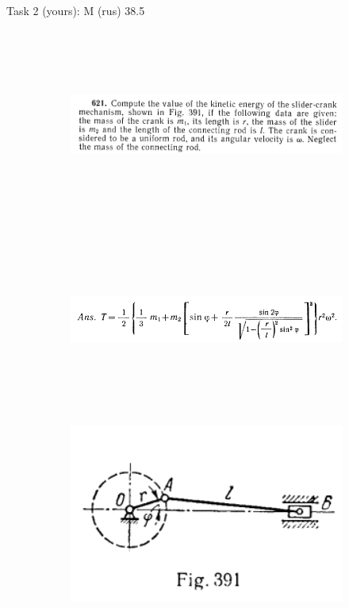 \documentclass[aspectratio=169]{beamer}
\begin{document}
    \begin{frame}[t]{Task 2 (yours): M (rus) 38.5}
    \framesubtitle{}
        \begin{figure}[H]
            \begin{subfigure}{0.9\textwidth}
                \centering\includegraphics[height=6cm,width=1\textwidth,keepaspectratio]{image11.png}
                \label{fig:image11}
            \end{subfigure}
            \begin{subfigure}{0.69\textwidth}
                \centering\includegraphics[height=6cm,width=1\textwidth,keepaspectratio]{image13.png}
                \label{fig:image13}
            \end{subfigure}
            \begin{subfigure}{0.3\textwidth}
                \vspace{-3.0cm}
                \includegraphics[height=6cm,width=1\textwidth,keepaspectratio]{image15.png}
                \label{fig:image15}
            \end{subfigure}
        \end{figure}
    \end{frame}
\end{document}
